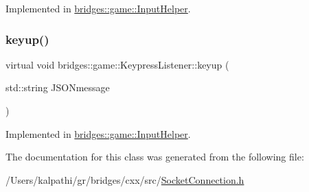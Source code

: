 Implemented in \mbox{\hyperlink{classbridges_1_1game_1_1_input_helper_aac75c2b1abf28afa4acaf730e925f301}{bridges\+::game\+::\+Input\+Helper}}.

\mbox{\label{classbridges_1_1game_1_1_keypress_listener_a21d9f085819e30c41f3964ea2276964d}} 
\subsubsection{\texorpdfstring{keyup()}{keyup()}}
{\footnotesize\ttfamily virtual void bridges\+::game\+::\+Keypress\+Listener\+::keyup (\begin{DoxyParamCaption}\item[{std\+::string}]{J\+S\+O\+Nmessage }\end{DoxyParamCaption})\hspace{0.3cm}{\ttfamily [pure virtual]}}



Implemented in \mbox{\hyperlink{classbridges_1_1game_1_1_input_helper_aa847f19c6f68ebbb63d73802abfcd9a0}{bridges\+::game\+::\+Input\+Helper}}.



The documentation for this class was generated from the following file\+:\begin{DoxyCompactItemize}
\item 
/\+Users/kalpathi/gr/bridges/cxx/src/\mbox{\hyperlink{_socket_connection_8h}{Socket\+Connection.\+h}}\end{DoxyCompactItemize}
